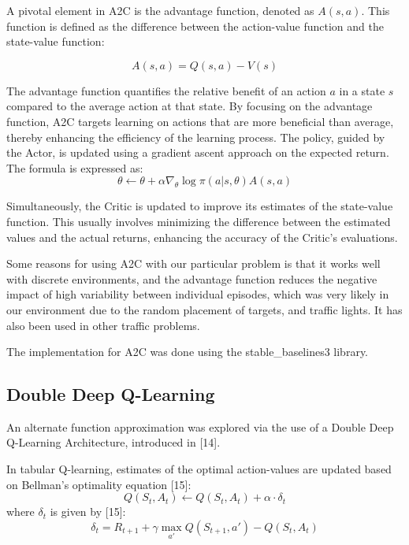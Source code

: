 \documentclass{article}
\begin{document}
	A pivotal element in A2C is the advantage function, denoted as \( A(s, a) \). This function is defined as the difference between the action-value function and the state-value function: 
	
	\begin{equation}
		A(s, a) = Q(s, a) - V(s)
	\end{equation}
	
	The advantage function quantifies the relative benefit of an action \( a \) in a state \( s \) compared to the average action at that state. By focusing on the advantage function, A2C targets learning on actions that are more beneficial than average, thereby enhancing the efficiency of the learning process. The policy, guided by the Actor, is updated using a gradient ascent approach on the expected return. The formula is expressed as: 
	\begin{equation}
		\theta \leftarrow \theta + \alpha \nabla_{\theta} \log \pi(a | s, \theta) A(s, a)
	\end{equation}
	
	Simultaneously, the Critic is updated to improve its estimates of the state-value function. This usually involves minimizing the difference between the estimated values and the actual returns, enhancing the accuracy of the Critic's evaluations.
	
	Some reasons for using A2C with our particular problem is that it works well with discrete environments, and the advantage function reduces the negative impact of high variability between individual episodes, which was very likely in our environment due to the random placement of targets, and traffic lights. It has also been used in other traffic problems.
	
	The implementation for A2C was done using the stable\_baselines3 library.
	
	
	\subsection{Double Deep Q-Learning}
	
	An alternate function approximation was explored via the use of a Double Deep Q-Learning Architecture, introduced in [14].
	
	In tabular Q-learning, estimates of the optimal action-values are updated based on Bellman's optimality equation [15]:
	\begin{equation}
		Q(S_{t}, A_{t}) \leftarrow Q(S_{t}, A_{t}) + \alpha\cdot\delta_{t}
	\end{equation}
	where $\delta_{t}$ is given by [15]:
	\begin{equation}
		\delta_{t} = R_{t+1} + \gamma\max_{a'}Q(S_{t+1}, a') - Q(S_{t}, A_{t})
	\end{equation}
	
\end{document}
